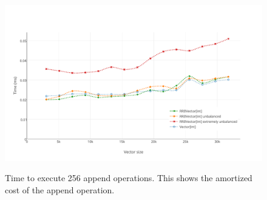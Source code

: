 \begin{figure}[h!]
  \centering
  \includegraphics[width=\textwidth]{Benchmarks/Append_3.pdf}
  \label{Append3Benchmarks}
  \caption{Time to execute 256 append operations. This shows the amortized cost of the append operation.}
\end{figure}

